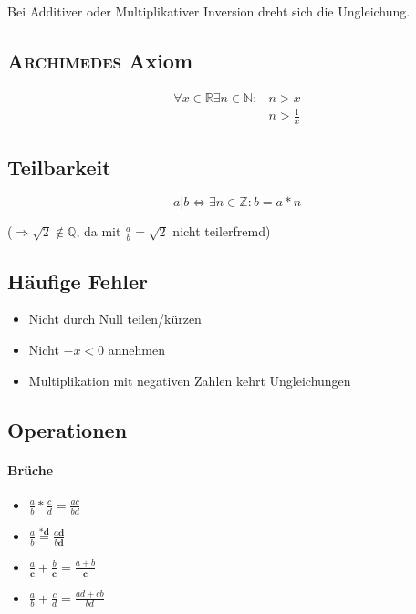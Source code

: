 Bei Additiver oder Multiplikativer Inversion dreht sich die Ungleichung.

\subsection{\textsc{Archimedes} Axiom}

\begin{align*}
      \forall x \in \mathbb{R} \exists n \in \mathbb{N}: & n > x           \\
                                                         & n > \frac{1}{x}
\end{align*}

\subsection{Teilbarkeit}

$$a | b \Leftrightarrow \exists n \in \mathbb{Z}: b = a * n$$

($\Rightarrow \sqrt{2} \notin \mathbb{Q}$, da mit $\frac{a}{b} = \sqrt{2}$ nicht teilerfremd)

\subsection{Häufige Fehler}

\begin{itemize}
      \item Nicht durch Null teilen/kürzen

      \item Nicht $-x < 0$ annehmen

      \item Multiplikation mit negativen Zahlen kehrt Ungleichungen
\end{itemize}

\subsection{Operationen}

\paragraph{Brüche}

\begin{itemize}
      \item $\frac{a}{b} * \frac{c}{d} = \frac{a c}{b d}$

      \item $\frac{a}{b} \overset{\mathbf{* d}}{=} \frac{a \mathbf{d}}{b \mathbf{d}}$

      \item $\frac{a}{\mathbf{c}} + \frac{b}{\mathbf{c}} = \frac{a + b}{\mathbf{c}}$

      \item $\frac{a}{b} + \frac{c}{d} = \frac{ad + cb}{bd}$
\end{itemize}

